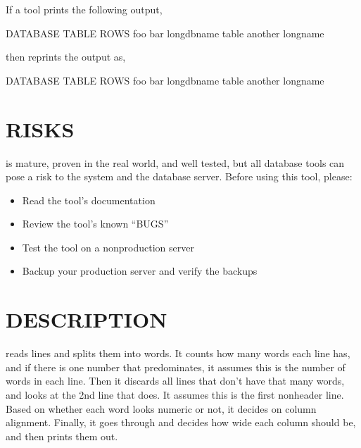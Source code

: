 \documentclass[letterpaper,10pt,english]{sphinxmanual}
\begin{document}
If a tool prints the following output,

\begin{sphinxVerbatim}[commandchars=\\\{\}]
DATABASE TABLE   ROWS
foo      bar      
long\PYGZus{}db\PYGZus{}name table  
another  long\PYGZus{}name 
\end{sphinxVerbatim}

then  reprints the output as,

\begin{sphinxVerbatim}[commandchars=\\\{\}]
DATABASE     TABLE     ROWS
foo          bar        
long\PYGZus{}db\PYGZus{}name table        
another      long\PYGZus{}name  
\end{sphinxVerbatim}


\section{RISKS}
\label{\detokenize{mariadb-align-output:risks}}
 is mature, proven in the real world, and well tested,
but all database tools can pose a risk to the system and the database
server.  Before using this tool, please:
\begin{itemize}
\item {} 
Read the tool’s documentation

\item {} 
Review the tool’s known “BUGS”

\item {} 
Test the tool on a non\sphinxhyphen{}production server

\item {} 
Backup your production server and verify the backups

\end{itemize}


\section{DESCRIPTION}
\label{\detokenize{mariadb-align-output:description}}
 reads lines and splits them into words.  It counts how many
words each line has, and if there is one number that predominates, it assumes
this is the number of words in each line.  Then it discards all lines that
don’t have that many words, and looks at the 2nd line that does.  It assumes
this is the first non\sphinxhyphen{}header line.  Based on whether each word looks numeric
or not, it decides on column alignment.  Finally, it goes through and decides
how wide each column should be, and then prints them out.
\end{document}
